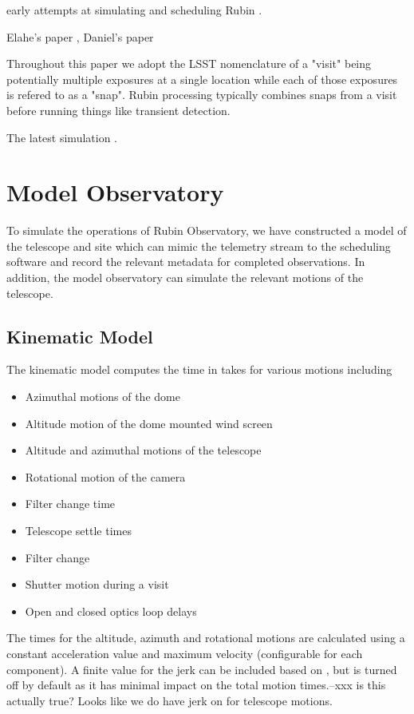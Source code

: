 \documentclass[]{aastex631}
\begin{document}
early attempts at simulating and scheduling Rubin \citet{Delgado2014, Delgado2016SPIE}.

Elahe's paper \citet{Naghib2019}, Daniel's paper \citep{Rothchild2019}

Throughout this paper we adopt the LSST nomenclature of a "visit" being potentially multiple exposures at a single location while each of those exposures is refered to as a "snap". Rubin processing typically combines snaps from a visit before running things like transient detection.

The latest simulation \citet{v4.3}.

\section{Model Observatory}\label{sec:model_obs}

To simulate the operations of Rubin Observatory, we have constructed a model of the telescope and site which can mimic the telemetry stream to the scheduling software and record the relevant metadata for completed observations. In addition, the model observatory can simulate the relevant motions of the telescope.

\subsection{Kinematic Model}
The kinematic model computes the time in takes for various motions including
\begin{itemize}
    \item{Azimuthal motions of the dome}
    \item{Altitude motion of the dome mounted wind screen}
    \item{Altitude and azimuthal motions of the telescope}
    \item{Rotational motion of the camera}
    \item{Filter change time}
    \item{Telescope settle times}
    \item{Filter change}
    \item{Shutter motion during a visit}
    \item{Open and closed optics loop delays}
\end{itemize}

The times for the altitude, azimuth and rotational motions are calculated using a constant acceleration value and maximum velocity (configurable for each component). A finite value for the jerk can be included based on \citet{Mu2009}, but is turned off by default as it has minimal impact on the total motion times.--xxx is this actually true? Looks like we do have jerk on for telescope motions.
\end{document}
